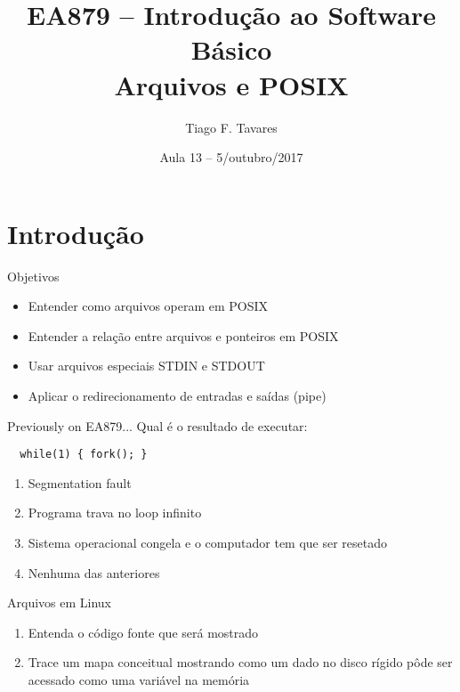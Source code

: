 \documentclass{beamer}
\title[13-posix-e-arquivos]{EA879 -- Introdução ao Software
Básico\\Arquivos e POSIX}
\author{Tiago F. Tavares}
\institute{FEEC -- UNICAMP}
\date{Aula 13 -- 5/outubro/2017}
\begin{document}
\begin{frame}
  \titlepage
\end{frame}


\section{Introdução}

\begin{frame}{Objetivos}
  \Large
  \begin{itemize}
    \item Entender como arquivos operam em POSIX
    \item Entender a relação entre arquivos e ponteiros em POSIX
    \item Usar arquivos especiais STDIN e STDOUT
    \item Aplicar o redirecionamento de entradas e saídas (pipe)
  \end{itemize}
\end{frame}

\begin{frame}[fragile]{Previously on EA879...}
  \centering
  \Large
  Qual é o resultado de executar:
  \begin{verbatim}
  while(1) { fork(); }
  \end{verbatim}
  \begin{enumerate}
    \item Segmentation fault
    \item Programa trava no loop infinito
    \item Sistema operacional congela e o computador tem que ser resetado
    \item Nenhuma das anteriores
  \end{enumerate}
\end{frame}

\begin{frame}[fragile]{Arquivos em Linux}
  \centering
  \large
  \begin{enumerate}
    \item Entenda o código fonte que será mostrado
    \item <2-> Trace um mapa conceitual mostrando como um dado no disco rígido
      pôde ser acessado como uma variável na memória
  \end{enumerate}

\end{frame}
\end{document}
